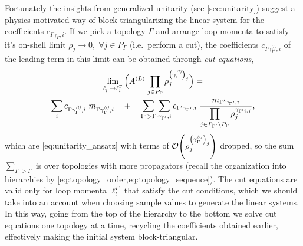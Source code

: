 {\def\gleading{{\gamma^{\textit{(l)}}_{\Gamma}}}
Fortunately the insights from generalized unitarity (see \cref{sec:unitarity}) suggest
a physics-motivated way of block-triangularizing the linear system for the coefficients $c_{\Gamma\gamma_\Gamma, i}$.
If we pick a topology $\Gamma$ and arrange loop momenta to satisfy it's on-shell limit $\rho_j \to 0,\;\forall j\in P_\Gamma$ (i.e.\ perform a cut),
the coefficients $c_{\Gamma\gleading,i}$ of the leading term in this limit
can be obtained through \emph{cut equations},
\begin{multline} \label{eq:cut_equations}
  \lim_{\ell^{\phantom{\Gamma}}_l \to \ell_l^{\Gamma}}\qty\Big( A^{(L)} \; {\prod_{j\in P_\Gamma} \rho_j^{\qty(\gleading)_j}} ) =  \\
  \sum_i c_{\Gamma\gleading, i} ~ m_{\Gamma\gleading, i} \quad + \quad 
  \sum_{\Gamma^\prime > \Gamma} \sum_{\gamma_{\Gamma^\prime}, i} 
  c_{\Gamma^\prime\gamma_{\Gamma^\prime}, i} \;
  \frac{m_{\Gamma^\prime\gamma_{\Gamma^\prime}, i}}{\displaystyle \prod_{j\in P_{\Gamma^\prime} \setminus P_\Gamma} \rho_j^{\gamma_{\Gamma^\prime i, j}}},
\end{multline}
which are \cref{eq:unitarity_ansatz} with terms of $\order{\rho_j^{\qty(\gleading)_j}}$ dropped, so
the sum $\sum_{\Gamma^\prime > \Gamma}$ is over topologies with more propagators 
(recall the organization into hierarchies by \cref{eq:topology_order,eq:topology_sequence}).
The cut equations are valid only for loop momenta $\ell_l^{\Gamma}$ that satisfy the cut conditions,
which we should take into an account when choosing sample values to generate the linear systems. 
In this way, going from the top of the hierarchy to the bottom
we solve cut equations one topology at a time, recycling the coefficients obtained earlier, effectively making the initial system block-triangular.

}
